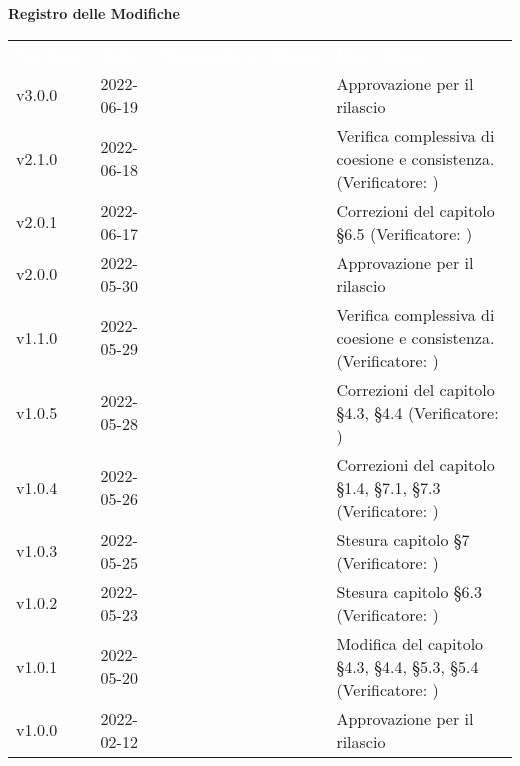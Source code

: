 
{\LARGE{\textbf{Registro delle Modifiche}}} \\
\renewcommand{\arraystretch}{1.5}
\begin{longtable}{ m{}<{\centering}  m{}<{\centering}  m{}<{\centering}  m{}<{\centering}  m{}<{\centering} }
	\rowcolor{darkblue}
	\textcolor{white}{\textbf{Versione}} &\textcolor{white}{\textbf{Data}}& \textcolor{white}{\textbf{Nominativo}} & \textcolor{white}{\textbf{Ruolo}}& \textcolor{white}{\textbf{Descrizione}} \\ 	
	
	v3.0.0& 2022-06-19 & \PV & \RE{}  & Approvazione per il rilascio \\

	v2.1.0& 2022-06-18 & \MB{} & \AM {} & Verifica complessiva di coesione e consistenza. (Verificatore: \textit{\GC})\\

	v2.0.1& 2022-06-17 & \MB & \AM{} & Correzioni del capitolo §6.5 (Verificatore: \textit{\GC})\\

	v2.0.0& 2022-05-30 & \PV & \RE{}  & Approvazione per il rilascio \\

	v1.1.0& 2022-05-29 & \MB{} & \AM {} & Verifica complessiva di coesione e consistenza. (Verificatore: \textit{\MG})\\

	v1.0.5& 2022-05-28 & \EP & \AM{} & Correzioni del capitolo §4.3, §4.4 (Verificatore: \textit{\GC})\\

	v1.0.4& 2022-05-26 & \MB & \AM{} & Correzioni del capitolo §1.4, §7.1, §7.3 (Verificatore: \textit{\GC})\\

	v1.0.3& 2022-05-25 & \MB & \AM{} & Stesura capitolo §7 (Verificatore: \textit{\GC})\\

	v1.0.2& 2022-05-23 & \EP & \AM{} & Stesura capitolo §6.3 (Verificatore: \textit{\GC})\\

	v1.0.1& 2022-05-20 & \EP & \AM{} & Modifica del capitolo §4.3, §4.4, §5.3, §5.4 (Verificatore:  \textit{\GC})\\	
	
	v1.0.0& 2022-02-12 & \GC & \RE{}  & Approvazione per il rilascio\\


\end{longtable}
